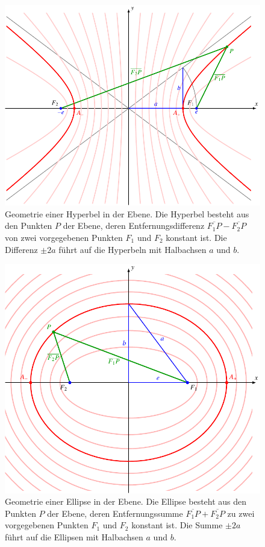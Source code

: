 \begin{figure}
\centering
\includegraphics{chapters/030-geometrie/images/hyperbel.pdf}
\caption{Geometrie einer Hyperbel in der Ebene.
Die Hyperbel besteht aus den Punkten $P$ der Ebene, deren Entfernungsdifferenz
$\overline{F_1P}-\overline{F_2P}$
von zwei vorgegebenen Punkten $F_1$ und $F_2$ konstant ist.
Die Differenz $\pm 2a$ führt auf die Hyperbeln mit Halbachsen
$a$ und $b$.
\label{buch:geometrie:hyperbel:fig:2d}}
\end{figure}
\begin{figure}
\centering
\includegraphics{chapters/030-geometrie/images/ellipse.pdf}
\caption{Geometrie einer Ellipse in der Ebene.
Die Ellipse besteht aus den Punkten $P$ der Ebene, deren Entfernungssumme
$\overline{F_1P}+\overline{F_2P}$
zu zwei vorgegebenen Punkten $F_1$ und $F_2$ konstant ist.
Die Summe $\pm 2a$ führt auf die Ellipsen mit Halbachsen
$a$ und $b$.
\label{buch:geometrie:ellipse:fig:2d}}
\end{figure}
